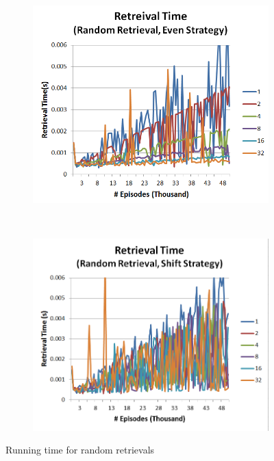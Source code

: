\documentclass[11pt]{article} %
\begin{document}
\begin{figure}
        \centering
        \begin{subfigure}[b]{0.55\textwidth}
                \centering
                \includegraphics[width=\textwidth]{images/ret_rand_eq}
                \label{fig:retreq}
        \end{subfigure}%
        ~ %
        \begin{subfigure}[b]{0.55\textwidth}
                \centering
                \includegraphics[width=\textwidth]{images/ret_rand_shift}
                \label{fig:retrshift}
        \end{subfigure}
        \caption{Running time for random retrievals}\label{fig:rand}
\end{figure}
\end{document}
